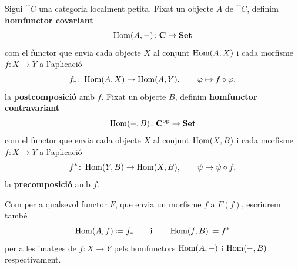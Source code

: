 \begin{definicio}\label{def:homfunctors}\label{ex:homfunctors}
Sigui $\cat{C}$ una categoria localment petita. Fixat un objecte $A$ de $\cat{C}$, definim \textbf{homfunctor covariant}
\[
\operatorname{Hom}(A,-)\colon\mathbf{C}\to\mathbf{Set}
\]
com el functor que envia cada objecte $X$ al conjunt $\operatorname{Hom}(A,X)$ i cada morfisme $f\colon X\to Y$ a l'aplicació
\[
f_*\colon\operatorname{Hom}(A,X)\to\operatorname{Hom}(A,Y),
\qquad
\varphi\mapsto f\circ\varphi,
\]
la \textbf{postcomposició} amb $f$. Fixat un objecte $B$, definim \textbf{homfunctor contravariant}
\[
\operatorname{Hom}(-,B)\colon\mathbf{C}^{\mathrm{op}}\to\mathbf{Set}
\]
com el functor que envia cada objecte $X$ al conjunt $\operatorname{Hom}(X,B)$ i cada morfisme $f\colon X\to Y$ a l'aplicació
\[
f^*\colon\operatorname{Hom}(Y,B)\to\operatorname{Hom}(X,B),
\qquad
\psi\mapsto\psi\circ f,
\]
la \textbf{precomposició} amb $f$.
\end{definicio}

\begin{notacio}\label{not:hom-morfismes}
Com per a qualsevol functor $F$, que envia un morfisme $f$ a $F(f)$, escriurem també
\[
\operatorname{Hom}(A,f)\coloneqq f_*
\qquad\text{i}\qquad
\operatorname{Hom}(f,B)\coloneqq f^*
\]
per a les imatges de $f\colon X\to Y$ pels homfunctors $\operatorname{Hom}(A,-)$ i $\operatorname{Hom}(-,B)$, respectivament.
\end{notacio}

